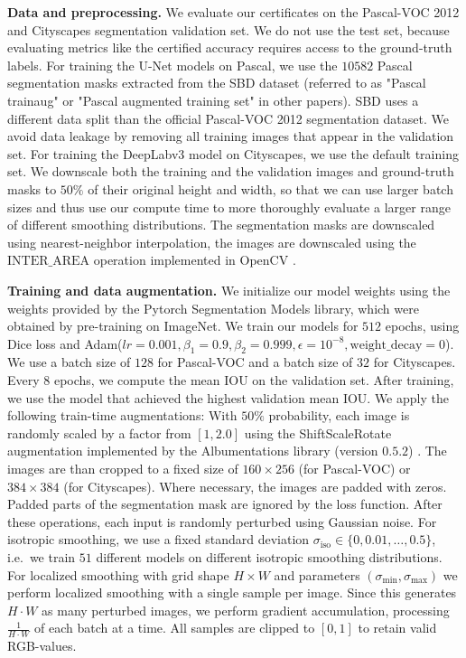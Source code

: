 \textbf{Data and preprocessing.} We evaluate our certificates on the Pascal-VOC 2012 and Cityscapes segmentation validation set. We do not use the test set, because evaluating metrics like the certified accuracy requires access to the ground-truth labels.
For training the U-Net models on Pascal, we use the $10582$ Pascal segmentation masks extracted from the SBD dataset \citep{Hariharan2011} (referred to as "Pascal trainaug" or "Pascal augmented training set" in other papers).
SBD uses a different data split than the official Pascal-VOC 2012 segmentation dataset. We avoid data leakage by removing all training images that appear in the validation set.
For training the DeepLabv3 model on Cityscapes, we use the default training set.
We downscale both the training and the validation images and ground-truth masks to $50\%$ of their original height and width, so that we can use larger batch sizes and thus use our compute time to more thoroughly evaluate a larger range of different smoothing distributions.
The segmentation masks are downscaled using nearest-neighbor interpolation, the images are downscaled using the $\mathrm{INTER\_AREA}$ operation implemented in OpenCV \citep{Bradski2000}.

\textbf{Training and data augmentation.}
We initialize our model weights using the weights provided by the Pytorch Segmentation Models library, which were obtained by pre-training on ImageNet.
We train our models for $512$ epochs, using Dice loss and Adam($lr=0.001,\beta_1=0.9,\beta_2=0.999,\epsilon=10^{-8}, \mathrm{weight\_decay}=0$).
We use a batch size of $128$ for Pascal-VOC and a batch size of $32$ for Cityscapes.
Every $8$ epochs, we compute the mean IOU on the validation set. After training, we use the model that achieved the highest validation mean IOU.
We apply the following train-time augmentations:
With $50\%$ probability, each image is randomly scaled by a factor from $[1,2.0]$ using the ShiftScaleRotate augmentation implemented by the Albumentations library (version $0.5.2$) \citep{Buslaev2020}. The images are than cropped to a fixed size of $160 \times 256$ (for Pascal-VOC) or $384 \times 384$ (for Cityscapes). Where necessary, the images are padded with zeros. Padded parts of the segmentation mask are ignored by the loss function.
After these operations, each input is randomly perturbed using Gaussian noise.
For isotropic smoothing, we use a fixed standard deviation $\sigma_\mathrm{iso} \in \{0,0.01,\dots, 0.5\}$, i.e.~we train $51$ different models on different isotropic smoothing distributions. 
For localized smoothing with grid shape $H \times W$ and parameters $(\sigma_\mathrm{min}, \sigma_\mathrm{max})$ we perform localized smoothing with a single sample per image. Since this generates $H \cdot W$ as many perturbed images, we perform gradient accumulation, processing $\frac{1}{H \cdot W}$ of each batch at a time.
All samples are clipped to $[0,1]$ to retain valid RGB-values.

